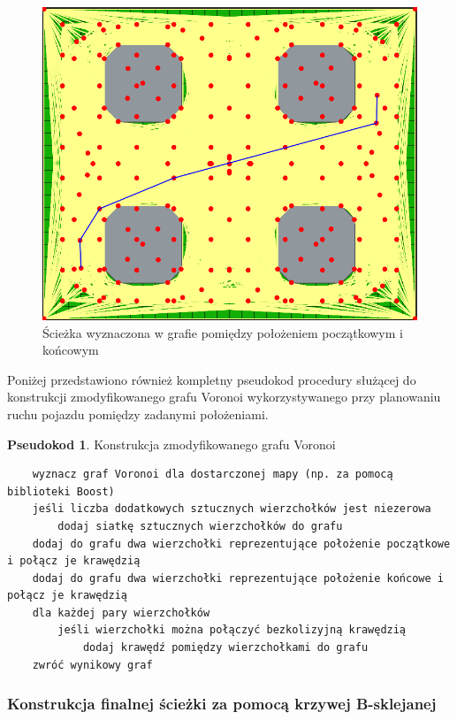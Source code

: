 \documentclass[a4paper,11pt,twoside]{report}
\theoremstyle{definition}
\newtheorem{pseudokod}{Pseudokod}[subsection]
\begin{document}
\begin{figure}[h!]
\centering
\includegraphics[scale=0.4]{polylinePathInVoronoiGraph}
\caption[Ścieżka wyznaczona w grafie pomiędzy położeniem początkowym i końcowym]{Ścieżka wyznaczona w grafie pomiędzy położeniem początkowym i końcowym}
\end{figure}

Poniżej przedstawiono również kompletny pseudokod procedury służącej do konstrukcji zmodyfikowanego grafu Voronoi wykorzystywanego przy planowaniu ruchu pojazdu pomiędzy zadanymi położeniami.

\begin{pseudokod}
Konstrukcja zmodyfikowanego grafu Voronoi
\begin{verbatim}
    wyznacz graf Voronoi dla dostarczonej mapy (np. za pomocą biblioteki Boost)
    jeśli liczba dodatkowych sztucznych wierzchołków jest niezerowa
        dodaj siatkę sztucznych wierzchołków do grafu
    dodaj do grafu dwa wierzchołki reprezentujące położenie początkowe i połącz je krawędzią
    dodaj do grafu dwa wierzchołki reprezentujące położenie końcowe i połącz je krawędzią
    dla każdej pary wierzchołków
        jeśli wierzchołki można połączyć bezkolizyjną krawędzią
            dodaj krawędź pomiędzy wierzchołkami do grafu
    zwróć wynikowy graf
\end{verbatim}
\end{pseudokod}

\subsubsection{Konstrukcja finalnej ścieżki za pomocą krzywej B-sklejanej}
\end{document}
